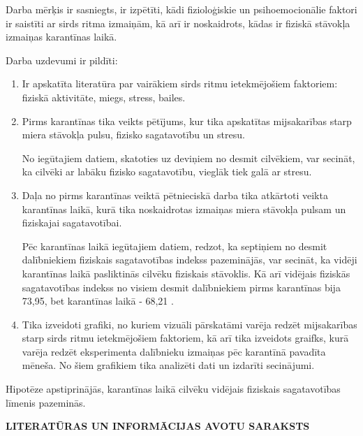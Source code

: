 \documentclass[12pt]{article}
\begin{document}
Darba mērķis ir sasniegts, ir izpētīti, kādi fizioloģiskie un psihoemocionālie faktori ir saistīti ar sirds ritma izmaiņām, kā arī ir noskaidrots, kādas ir fiziskā stāvokļa izmaiņas karantīnas laikā. \par
Darba uzdevumi ir pildīti:
\begin{enumerate}
  \item Ir apskatīta literatūra par vairākiem sirds ritmu ietekmējošiem faktoriem: fiziskā aktivitāte, miegs, stress, bailes.
  \item Pirms karantīnas tika veikts pētījums, kur tika apskatītas mijsakarības starp miera stāvokļa pulsu, fizisko sagatavotību un stresu.\par
  No iegūtajiem datiem, skatoties uz deviņiem no desmit cilvēkiem, var secināt, ka cilvēki ar labāku fizisko sagatavotību, vieglāk tiek galā ar stresu.
  \item Daļa no pirms karantīnas veiktā pētnieciskā darba tika atkārtoti veikta karantīnas laikā, kurā tika noskaidrotas izmaiņas miera stāvokļa pulsam un fiziskajai sagatavotībai. \par
Pēc karantīnas laikā iegūtajiem datiem, redzot, ka septiņiem no desmit dalībniekiem fiziskais sagatavotības indekss pazeminājās, var secināt, ka vidēji karantīnas laikā pasliktinās cilvēku fiziskais stāvoklis. Kā arī vidējais fiziskās sagatavotības indekss no visiem desmit dalībniekiem pirms karantīnas bija 73,95, bet karantīnas laikā - 68,21 .
\item Tika izveidoti grafiki, no kuriem vizuāli pārskatāmi varēja redzēt mijsakarības starp sirds ritmu ietekmējošiem faktoriem, kā arī tika izveidots graifks, kurā varēja redzēt eksperimenta dalībnieku izmaiņas pēc karantīnā pavadīta mēneša. No šiem grafikiem tika analizēti dati un izdarīti secinājumi.
\end{enumerate}
Hipotēze apstiprinājās, karantīnas laikā cilvēku vidējais fiziskais sagatavotības līmenis pazeminās.

\newpage
\begin{center}
\fontsize{14}{}\selectfont\textbf{LITERATŪRAS UN INFORMĀCIJAS AVOTU SARAKSTS}
\def\contname{\empty}
\end{center}
\end{document}
